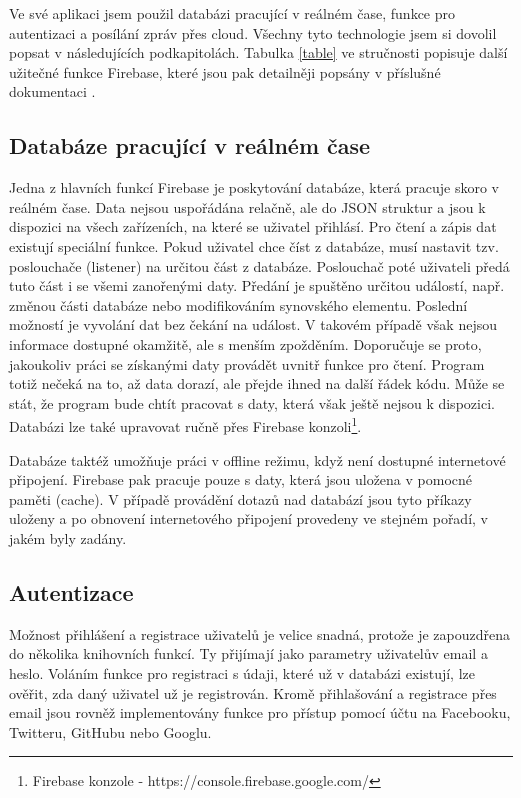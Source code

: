 Ve své aplikaci jsem použil databázi pracující v reálném čase, funkce pro autentizaci a posílání zpráv přes cloud. Všechny tyto technologie jsem si dovolil popsat v následujících podkapitolách. Tabulka \ref{table} ve stručnosti popisuje další užitečné funkce Firebase, které jsou pak detailněji popsány v příslušné dokumentaci \cite{firebase}.

\subsection*{Databáze pracující v reálném čase}
Jedna z hlavních funkcí Firebase je poskytování databáze, která pracuje skoro v reálném čase. Data nejsou uspořádána relačně, ale do JSON struktur a jsou k dispozici na všech zařízeních, na které se uživatel přihlásí. Pro čtení a zápis dat existují speciální funkce. Pokud uživatel chce číst z databáze, musí nastavit tzv. poslouchače (listener) na určitou část z databáze. Poslouchač poté uživateli předá tuto část i se všemi zanořenými daty. Předání je spuštěno určitou událostí, např. změnou části databáze nebo modifikováním synovského elementu. Poslední možností je vyvolání dat bez čekání na událost. V takovém případě však nejsou informace dostupné okamžitě, ale s menším zpožděním. Doporučuje se proto, jakoukoliv práci se získanými daty provádět uvnitř funkce pro čtení. Program totiž nečeká na to, až data dorazí, ale přejde ihned na další řádek kódu. Může se stát, že program bude chtít pracovat s daty, která však ještě nejsou k dispozici. Databázi lze také upravovat ručně přes Firebase konzoli\footnote{Firebase konzole -  https://console.firebase.google.com/}.   

Databáze taktéž umožňuje práci v offline režimu, když není dostupné internetové připojení. Firebase pak pracuje pouze s daty, která jsou uložena v pomocné paměti (cache). V případě provádění dotazů nad databází jsou tyto příkazy uloženy a po obnovení internetového připojení provedeny ve stejném pořadí, v jakém byly zadány.

\subsection*{Autentizace}
Možnost přihlášení a registrace uživatelů je velice snadná, protože je zapouzdřena do několika knihovních funkcí. Ty přijímají jako parametry uživatelův email a heslo. Voláním funkce pro registraci s údaji, které už v databázi existují, lze ověřit, zda daný uživatel už je registrován. Kromě přihlašování a registrace přes email jsou rovněž implementovány funkce pro přístup pomocí účtu na Facebooku, Twitteru, GitHubu nebo Googlu.

